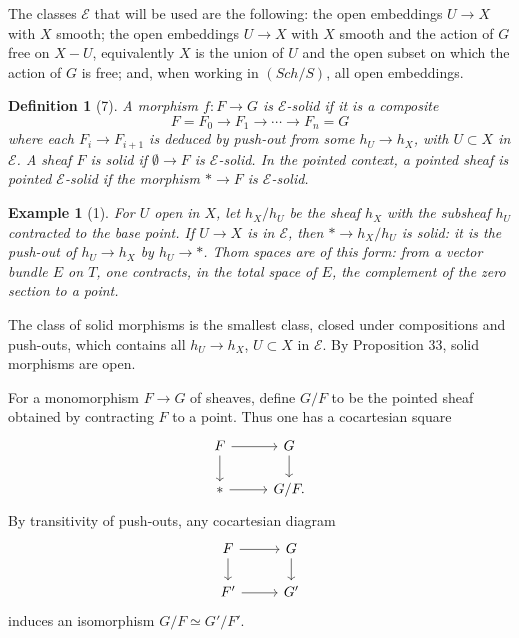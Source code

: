 \documentclass[11pt]{article}
\newcommand{\pt}{*}
\theoremstyle{deligne}
\newtheorem*{definition*}{Definition}
\newtheorem*{example*}{Example}
\begin{document}
The classes \(\mathcal E\) that will be used are the following: the open embeddings \(U\to X\) with \(X\) smooth; the open embeddings \(U\to X\) with \(X\) smooth and the action of \(G\) free on \(X-U\), equivalently \(X\) is the union of \(U\) and the open subset on which the action of \(G\) is free; and, when working in \((Sch/S)\), all open embeddings.

\begin{definition*}[7]
A morphism \(f:F\to G\) is \(\mathcal E\)-solid if it is a composite
\[
F=F_0\longrightarrow F_1\longrightarrow \cdots\longrightarrow F_n=G
\]
where each \(F_i\to F_{i+1}\) is deduced by push-out from some \(h_U\to h_X\), with \(U\subset X\) in \(\mathcal E\). A sheaf \(F\) is solid if \(\emptyset\to F\) is \(\mathcal E\)-solid. In the pointed context, a pointed sheaf is pointed \(\mathcal E\)-solid if the morphism \(\pt\to F\) is \(\mathcal E\)-solid.
\end{definition*}

\begin{example*}[1]
For \(U\) open in \(X\), let \(h_X/h_U\) be the sheaf \(h_X\) with the subsheaf \(h_U\) contracted to the base point. If \(U\to X\) is in \(\mathcal E\), then \(\pt\to h_X/h_U\) is solid: it is the push-out of \(h_U\to h_X\) by \(h_U\to\pt\). Thom spaces are of this form: from a vector bundle \(E\) on \(T\), one contracts, in the total space of \(E\), the complement of the zero section to a point.
\end{example*}

The class of solid morphisms is the smallest class, closed under compositions and push-outs, which contains all \(h_U\to h_X\), \(U\subset X\) in \(\mathcal E\). By Proposition 33, solid morphisms are open.

For a monomorphism \(F\to G\) of sheaves, define \(G/F\) to be the pointed sheaf obtained by contracting \(F\) to a point. Thus one has a cocartesian square
\[
\begin{tikzcd}[column sep=2.6em,row sep=1.6em]
F \arrow[r] \arrow[d] & G \arrow[d]\\
\pt \arrow[r] & G/F .
\end{tikzcd}
\]
By transitivity of push-outs, any cocartesian diagram
\[
\begin{tikzcd}[column sep=2.6em,row sep=1.6em]
F \arrow[r] \arrow[d] & G \arrow[d]\\
F' \arrow[r] & G'
\end{tikzcd}
\]
induces an isomorphism \(G/F\simeq G'/F'\).
\end{document}
